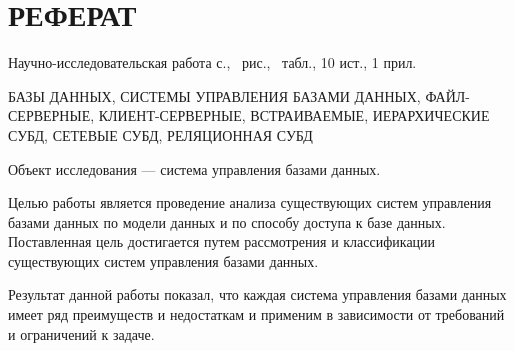 \section*{\centering РЕФЕРАТ}
\setcounter{page}{2}

Научно-исследовательская работа \pageref{LastPage} с., \totalfigures\ рис., \totaltables\ табл., 10 ист., 1 прил.

БАЗЫ ДАННЫХ, СИСТЕМЫ УПРАВЛЕНИЯ БАЗАМИ ДАННЫХ, ФАЙЛ-СЕРВЕРНЫЕ, КЛИЕНТ-СЕРВЕРНЫЕ, ВСТРАИВАЕМЫЕ, ИЕРАРХИЧЕСКИЕ СУБД, СЕТЕВЫЕ СУБД, РЕЛЯЦИОННАЯ СУБД

Объект исследования --- система управления базами данных.

Целью работы является проведение анализа существующих систем управления базами данных по модели данных и по способу доступа к базе данных.
Поставленная цель достигается путем рассмотрения и классификации существующих систем управления базами данных.

Результат данной работы показал, что каждая система управления базами данных имеет ряд преимуществ и недостаткам и применим в зависимости от требований и ограничений к задаче.